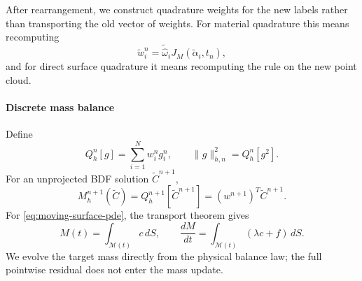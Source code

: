 \documentclass[a4paper,fleqn]{cas-sc}
\begin{document}
After rearrangement, we construct quadrature weights for the new labels rather
than transporting the old vector of weights.  For material quadrature this
means recomputing
\[
  \widetilde w_i^n
  =
  \widetilde{\widehat\omega}_i
  J_M(\widetilde \alpha_i,t_n),
\]
and for direct surface quadrature it means recomputing the rule on the new
point cloud.

\paragraph{Discrete mass balance}
Define
\begin{equation}
  Q_h^n[g]=\sum_{i=1}^Nw_i^ng_i^n,
  \qquad
  \|g\|_{h,n}^2=Q_h^n[g^2].
  \label{eq:geometry-quadrature-functional}
\end{equation}
For an unprojected BDF solution $\widetilde C^{n+1}$,
\[
  M_h^{n+1}(\widetilde C)
  =Q_h^{n+1}[\widetilde C^{n+1}]
  =(w^{n+1})^T\widetilde C^{n+1}.
\]
For \eqref{eq:moving-surface-pde}, the transport theorem gives
\[
  M(t)=\int_{\mathcal M(t)}c\,dS,
  \qquad
  \frac{dM}{dt}
  =
  \int_{\mathcal M(t)}(\lambda c+f)\,dS.
\]
We evolve the target mass directly from the physical balance law; the full
pointwise residual does not enter the mass update.
\end{document}
